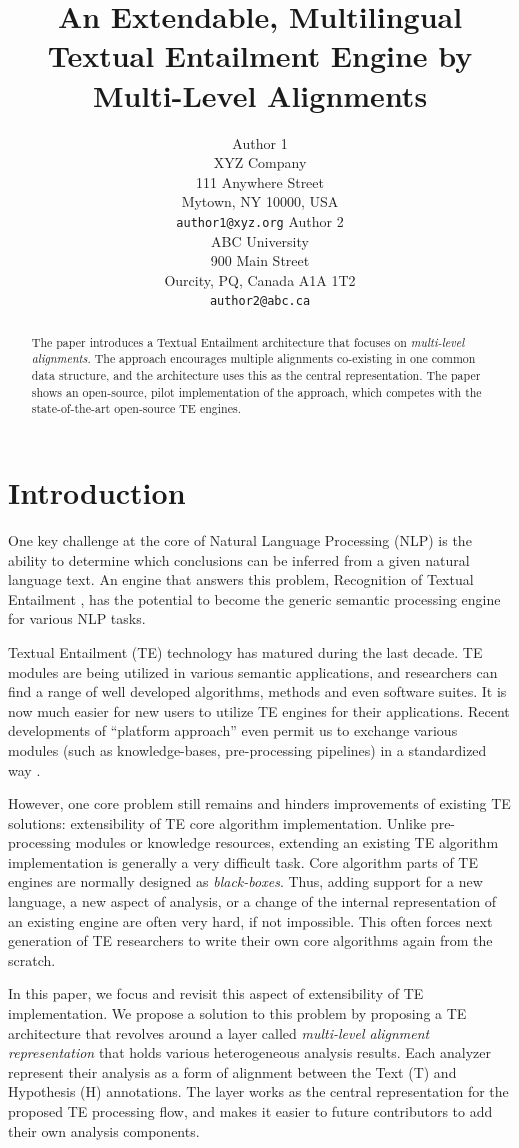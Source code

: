 \documentclass[11pt,letterpaper]{article}
\title{An Extendable, Multilingual Textual Entailment Engine by
  Multi-Level Alignments}
\author{Author 1\\
	    XYZ Company\\
	    111 Anywhere Street\\
	    Mytown, NY 10000, USA\\
	    {\tt author1@xyz.org}
	  \And
	Author 2\\
  	ABC University\\
  	900 Main Street\\
  	Ourcity, PQ, Canada A1A 1T2\\
  {\tt author2@abc.ca}}
\date{}
\begin{document}
\maketitle
\begin{abstract}
The paper introduces a Textual Entailment architecture that focuses
on {\em multi-level alignments}. The approach encourages multiple
alignments co-existing in one common data structure, and the
architecture uses this as the central representation. The paper shows
an open-source, pilot implementation of the approach, which competes
with the state-of-the-art open-source TE engines.  
\end{abstract}

\section{Introduction}
One key challenge at the core of Natural Language Processing (NLP) is
the ability to determine which conclusions can be inferred from a
given natural language text. An engine that answers this problem,
Recognition of Textual Entailment \cite{}, has the potential to
become the generic semantic processing engine for various NLP tasks.     

Textual Entailment (TE) technology has matured during the last
decade. TE modules are being utilized in various semantic
applications, and researchers can find a range of well developed
algorithms, methods and even software suites. It is now much easier
for new users to utilize TE engines for their applications. Recent 
developments of ``platform approach'' even permit us to exchange
various modules (such as knowledge-bases, pre-processing pipelines) in
a standardized way \cite{EOP-arch}. 

However, one core problem still remains and hinders improvements of  
existing TE solutions: extensibility of TE core algorithm
implementation. Unlike pre-processing modules or knowledge resources,   
extending an existing TE algorithm implementation is generally a very
difficult task. Core algorithm parts of TE engines are normally
designed as {\em black-boxes}. Thus, adding support for a new
language, a new aspect of analysis, or a change of the internal
representation of an existing engine are often very hard, if not
impossible. This often forces next generation of TE researchers to
write their own core algorithms again from the scratch.

In this paper, we focus and revisit this aspect of extensibility of TE
implementation. We propose a solution to this problem by proposing a 
TE architecture that revolves around a layer called {\em multi-level
  alignment representation} that holds various heterogeneous analysis
results. Each analyzer represent their analysis as a form of alignment
between the Text (T) and Hypothesis (H) annotations. The layer works
as the central representation for the proposed TE processing flow, and
makes it easier to future contributors to add their own analysis
components. 
\end{document}
